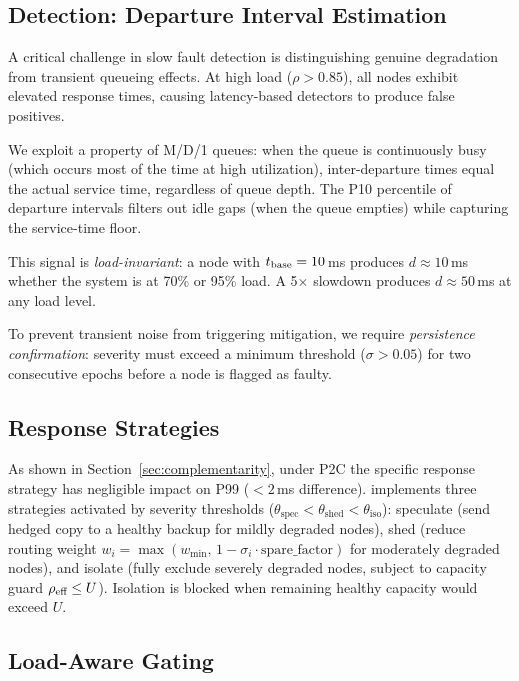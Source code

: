 \subsection{Detection: Departure Interval Estimation}
\label{sec:detection}

A critical challenge in slow fault detection is distinguishing genuine
degradation from transient queueing effects. At high load ($\rho >
0.85$), all nodes exhibit elevated response times, causing latency-based
detectors to produce false positives.

We exploit a property of M/D/1 queues: when the queue is continuously
busy (which occurs most of the time at high utilization), inter-departure
times equal the actual service time, regardless of queue depth. The P10
percentile of departure intervals filters out idle gaps (when the queue
empties) while capturing the service-time floor.

This signal is \emph{load-invariant}: a node with $t_{\text{base}} = 10$\,ms
produces $d \approx 10$\,ms whether the system is at 70\% or 95\% load.
A 5$\times$ slowdown produces $d \approx 50$\,ms at any load level.

To prevent transient noise from triggering mitigation, we require
\emph{persistence confirmation}: severity must exceed a minimum
threshold ($\sigma > 0.05$) for two consecutive epochs before a node is
flagged as faulty.

\subsection{Response Strategies}
\label{sec:strategies}

As shown in Section~\ref{sec:complementarity}, under P2C the specific
response strategy has negligible impact on P99 ($< 2$\,ms difference).
\system{} implements three strategies activated by severity thresholds
($\theta_{\text{spec}} < \theta_{\text{shed}} < \theta_{\text{iso}}$):
speculate (send hedged copy to a healthy backup for mildly degraded
nodes), shed (reduce routing weight
$w_i = \max(w_{\min},\, 1 - \sigma_i \cdot \text{spare\_factor})$
for moderately degraded nodes), and isolate (fully exclude severely
degraded nodes, subject to capacity guard $\rho_{\text{eff}} \leq U$).
Isolation is blocked when remaining healthy capacity would exceed $U$.

\subsection{Load-Aware Gating}

